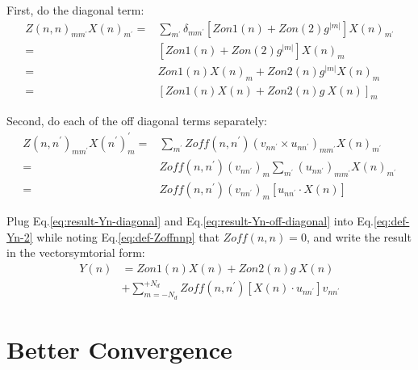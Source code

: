 \documentclass [10pt,letterpaper]{article}
\begin{document}
First, do the diagonal term:
\begin{equation} \label{eq:result-Yn-diagonal}
	\begin{split}
		Z(n,n)_{m m^\prime}
		X(n)_{m^\prime}
		=&
		\sum\nolimits_{m^\prime}
		\delta_{m m^\prime}
		[ Zon1(n)+Zon(2)g^{\lvert m \rvert} ]
		X(n)_{m^\prime} 
		\\
		=&
		[ Zon1(n)+Zon(2)g^{\lvert m \rvert} ]
		X(n)_{m} 
		\\
		=&
		Zon1(n)X(n)_m
		+
		Zon2(n)g^{\lvert m \rvert} X(n)_m
		\\
		=&
		[Zon1(n)X(n)+Zon2(n)g\ X(n)]_m
	\end{split}
\end{equation}

Second, do each of the off diagonal terms separately:
\begin{equation} \label{eq:result-Yn-off-diagonal}
	\begin{split}
		Z(n,n^\prime)_{m m^\prime}
		X(n^\prime)_m^\prime
		=&
		\sum\nolimits_{m^\prime}
		Zoff(n,n^\prime)
		(
		v_{n n^\prime}
		\times
		u_{n n^\prime}
		)_{m m^\prime}
		X(n)_{m^\prime}
		\\
		=&
		Zoff(n,n^\prime)
		(v_{n n^\prime})_m
		\sum\nolimits_{m^\prime}
		(
		u_{n n^\prime}
		)_{m m^\prime}
		X(n)_{m^\prime} 
		\\
		=&
		Zoff(n,n^\prime)
		(v_{n n^\prime})_m
		[
			u_{n n^\prime}
			\cdot
			X(n)
		]
	\end{split}
\end{equation}

Plug Eq.\eqref{eq:result-Yn-diagonal} and Eq.\eqref{eq:result-Yn-off-diagonal} into Eq.\eqref{eq:def-Yn-2} while noting Eq.\eqref{eq:def-Zoffnnp} that $Zoff(n,n)=0$, and write the result in the vectorsymtorial form:
\begin{equation} \label{eq:result-Yn}
	\begin{split}
		Y(n)
		&= 
		Zon1(n) X(n)
		+
		Zon2(n) g\ X(n)
		\\
		&+
		\sum \nolimits_{m=-N_d}^{+N_d}
		Zoff(n,n^\prime)
		[ X(n)\cdot u_{n n^\prime} ]
		v_{n n^\prime}
	\end{split}
\end{equation}





\section{Better Convergence}
\label{sec:better-convergence}
\end{document}
